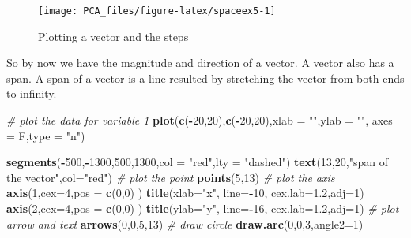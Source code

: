 \documentclass[
]{book}
\newenvironment{Shaded}{\begin{snugshade}}{\end{snugshade}}
\newcommand{\CommentTok}[1]{\textcolor[rgb]{0.56,0.35,0.01}{\textit{#1}}}
\newcommand{\DataTypeTok}[1]{\textcolor[rgb]{0.13,0.29,0.53}{#1}}
\newcommand{\DecValTok}[1]{\textcolor[rgb]{0.00,0.00,0.81}{#1}}
\newcommand{\FloatTok}[1]{\textcolor[rgb]{0.00,0.00,0.81}{#1}}
\newcommand{\KeywordTok}[1]{\textcolor[rgb]{0.13,0.29,0.53}{\textbf{#1}}}
\newcommand{\NormalTok}[1]{#1}
\newcommand{\OperatorTok}[1]{\textcolor[rgb]{0.81,0.36,0.00}{\textbf{#1}}}
\newcommand{\StringTok}[1]{\textcolor[rgb]{0.31,0.60,0.02}{#1}}
\theoremstyle{definition}
\theoremstyle{definition}
\theoremstyle{definition}
\theoremstyle{remark}
\begin{document}
\begin{figure}

{\centering \texttt{[image: PCA\_files/figure-latex/spaceex5-1]} 

}

\caption{Plotting a vector and the steps}\label{fig:spaceex5}
\end{figure}

So by now we have the magnitude and direction of a vector. A vector also has a span. A span of a vector is a line resulted by stretching the vector from both ends to infinity.

\begin{Shaded}
\begin{Highlighting}[]
\CommentTok{# plot the data for variable 1}
\KeywordTok{plot}\NormalTok{(}\KeywordTok{c}\NormalTok{(}\OperatorTok{-}\DecValTok{20}\NormalTok{,}\DecValTok{20}\NormalTok{),}\KeywordTok{c}\NormalTok{(}\OperatorTok{-}\DecValTok{20}\NormalTok{,}\DecValTok{20}\NormalTok{),}\DataTypeTok{xlab =} \StringTok{""}\NormalTok{,}\DataTypeTok{ylab =} \StringTok{""}\NormalTok{,}
 \DataTypeTok{axes =}\NormalTok{ F,}\DataTypeTok{type =} \StringTok{"n"}\NormalTok{)}

\KeywordTok{segments}\NormalTok{(}\OperatorTok{-}\DecValTok{500}\NormalTok{,}\OperatorTok{-}\DecValTok{1300}\NormalTok{,}\DecValTok{500}\NormalTok{,}\DecValTok{1300}\NormalTok{,}\DataTypeTok{col =} \StringTok{"red"}\NormalTok{,}\DataTypeTok{lty =} \StringTok{"dashed"}\NormalTok{)}
\KeywordTok{text}\NormalTok{(}\DecValTok{13}\NormalTok{,}\DecValTok{20}\NormalTok{,}\StringTok{"span of the vector"}\NormalTok{,}\DataTypeTok{col=}\StringTok{"red"}\NormalTok{)}
\CommentTok{# plot the point}
\KeywordTok{points}\NormalTok{(}\DecValTok{5}\NormalTok{,}\DecValTok{13}\NormalTok{)}
\CommentTok{# plot the axis}
\KeywordTok{axis}\NormalTok{(}\DecValTok{1}\NormalTok{,}\DataTypeTok{cex=}\DecValTok{4}\NormalTok{,}\DataTypeTok{pos =} \KeywordTok{c}\NormalTok{(}\DecValTok{0}\NormalTok{,}\DecValTok{0}\NormalTok{) )}
\KeywordTok{title}\NormalTok{(}\DataTypeTok{xlab=}\StringTok{"x"}\NormalTok{, }\DataTypeTok{line=}\OperatorTok{-}\DecValTok{10}\NormalTok{, }\DataTypeTok{cex.lab=}\FloatTok{1.2}\NormalTok{,}\DataTypeTok{adj=}\DecValTok{1}\NormalTok{)}
\KeywordTok{axis}\NormalTok{(}\DecValTok{2}\NormalTok{,}\DataTypeTok{cex=}\DecValTok{4}\NormalTok{,}\DataTypeTok{pos =} \KeywordTok{c}\NormalTok{(}\DecValTok{0}\NormalTok{,}\DecValTok{0}\NormalTok{) )}
\KeywordTok{title}\NormalTok{(}\DataTypeTok{ylab=}\StringTok{"y"}\NormalTok{, }\DataTypeTok{line=}\OperatorTok{-}\DecValTok{16}\NormalTok{, }\DataTypeTok{cex.lab=}\FloatTok{1.2}\NormalTok{,}\DataTypeTok{adj=}\DecValTok{1}\NormalTok{)}
\CommentTok{# plot arrow and text}
\KeywordTok{arrows}\NormalTok{(}\DecValTok{0}\NormalTok{,}\DecValTok{0}\NormalTok{,}\DecValTok{5}\NormalTok{,}\DecValTok{13}\NormalTok{)}
\CommentTok{# draw circle}
\KeywordTok{draw.arc}\NormalTok{(}\DecValTok{0}\NormalTok{,}\DecValTok{0}\NormalTok{,}\DecValTok{3}\NormalTok{,}\DataTypeTok{angle2=}\DecValTok{1}\NormalTok{)}


\end{Highlighting}
\end{Shaded}
\end{document}

